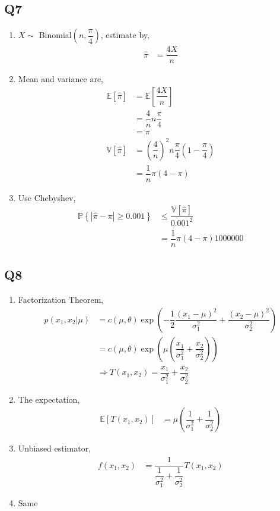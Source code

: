 \documentclass{article}
\begin{document}
\subsection{Q7}
\begin{enumerate}
\item $X  \sim $ Binomial$\left(n , \dfrac{\pi}{4}\right)$, estimate by,
\begin{align*}
\hat{\pi} &= \dfrac{4 X}{n}
\end{align*}
\item Mean and variance are,
\begin{align*}
\mathbb{E}\left[\hat{\pi}\right] &= \mathbb{E}\left[\dfrac{4 X}{n}\right]
\\ &= \dfrac{4}{n} n \dfrac{\pi}{4}
\\ &= \pi
\\ \mathbb{V}\left[\hat{\pi}\right] &= \left(\dfrac{4}{n}\right)^{2} n \dfrac{\pi}{4} \left(1 - \dfrac{\pi}{4}\right)
\\ &= \dfrac{1}{n} \pi \left(4 - \pi\right)
\end{align*}
\item Use Chebyshev,
\begin{align*}
\mathbb{P}\left\{| \hat{\pi} - \pi | \geq  0.001\right\} &\leq  \dfrac{\mathbb{V}\left[\hat{\pi}\right]}{0.001^{2}}
\\ &= \dfrac{1}{n} \pi \left(4 - \pi\right) 1000000
\end{align*}
\end{enumerate}


\subsection{Q8}
\begin{enumerate}
\item Factorization Theorem,
\begin{align*}
p\left(x_{1}, x_{2} | \mu\right)  &= c\left(\mu, \theta\right) \exp\left(- \dfrac{1}{2} \dfrac{\left(x_{1} - \mu\right)^{2}}{\sigma_{1}^{2}} + \dfrac{\left(x_{2} - \mu\right)^{2}}{\sigma_{2}^{2}}\right)
\\ &= c\left(\mu, \theta\right) \exp\left(\mu \left(\dfrac{x_{1}}{\sigma_{1}^{2}} + \dfrac{x_{2}}{\sigma_{2}^{2}}\right)\right)
\\ &\Rightarrow  T\left(x_{1}, x_{2}\right) = \dfrac{x_{1}}{\sigma_{1}^{2}} + \dfrac{x_{2}}{\sigma_{2}^{2}}
\end{align*}
\item The expectation,
\begin{align*}
\mathbb{E}\left[T\left(x_{1}, x_{2}\right)\right] &= \mu \left(\dfrac{1}{\sigma_{1}^{2}} + \dfrac{1}{\sigma_{2}^{2}}\right)
\end{align*}
\item Unbiased estimator,
\begin{align*}
f\left(x_{1}, x_{2}\right)  &= \dfrac{1}{\dfrac{1}{\sigma_{1}^{2}} + \dfrac{1}{\sigma_{2}^{2}}} T\left(x_{1}, x_{2}\right)
\end{align*}
\item Same
\end{enumerate}
\end{document}
